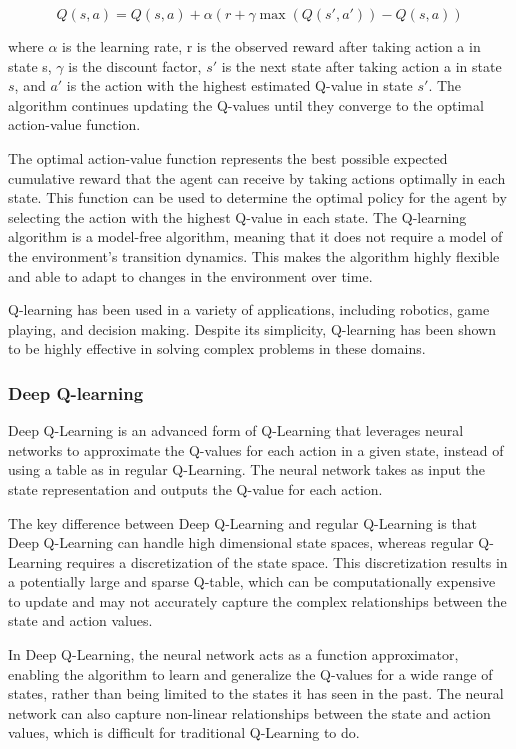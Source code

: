 \documentclass[
  12pt,
  a4paper,
  DIV=11,
  numbers=noendperiod]{scrartcl}
\begin{document}
\[
Q(s, a) = Q(s, a) + \alpha (r + \gamma \max(Q(s', a')) - Q(s, a))
\]

where \(\alpha\) is the learning rate, r is the observed reward after
taking action a in state s, \(\gamma\) is the discount factor, \(s'\) is
the next state after taking action a in state \(s\), and \(a'\) is the
action with the highest estimated Q-value in state \(s'\). The algorithm
continues updating the Q-values until they converge to the optimal
action-value function.

The optimal action-value function represents the best possible expected
cumulative reward that the agent can receive by taking actions optimally
in each state. This function can be used to determine the optimal policy
for the agent by selecting the action with the highest Q-value in each
state. The Q-learning algorithm is a model-free algorithm, meaning that
it does not require a model of the environment's transition dynamics.
This makes the algorithm highly flexible and able to adapt to changes in
the environment over time.

Q-learning has been used in a variety of applications, including
robotics, game playing, and decision making. Despite its simplicity,
Q-learning has been shown to be highly effective in solving complex
problems in these domains.

\hypertarget{deep-q-learning}{%
\subsubsection{Deep Q-learning}\label{deep-q-learning}}

Deep Q-Learning is an advanced form of Q-Learning that leverages neural
networks to approximate the Q-values for each action in a given state,
instead of using a table as in regular Q-Learning. The neural network
takes as input the state representation and outputs the Q-value for each
action.

The key difference between Deep Q-Learning and regular Q-Learning is
that Deep Q-Learning can handle high dimensional state spaces, whereas
regular Q-Learning requires a discretization of the state space. This
discretization results in a potentially large and sparse Q-table, which
can be computationally expensive to update and may not accurately
capture the complex relationships between the state and action values.

In Deep Q-Learning, the neural network acts as a function approximator,
enabling the algorithm to learn and generalize the Q-values for a wide
range of states, rather than being limited to the states it has seen in
the past. The neural network can also capture non-linear relationships
between the state and action values, which is difficult for traditional
Q-Learning to do.
\end{document}
